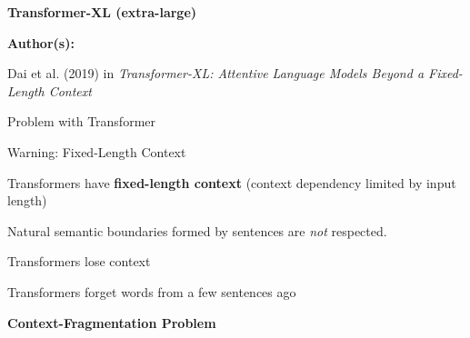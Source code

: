 
\begin{frame}{}
    \begin{center}
        \large \textbf{Transformer-XL (extra-large)}
    \end{center}
    \vspace{20pt}
    
    \textbf{Author(s):}
    \begin{itemizeSpaced}{5pt}
    {\color{DimGrey} 
    
        \item Dai et al. (2019) in \emph{Transformer-XL: Attentive Language Models Beyond a Fixed-Length Context}
        
    }
    \end{itemizeSpaced}
\end{frame}




\begin{frame}{Problem with Transformer}
    
    \begin{alertBlock}{Warning: Fixed-Length Context}
        \footnotesize 
        
        Transformers have \textbf{\alert{fixed-length context}} (context dependency limited by input length) \newline 
        
        Natural semantic boundaries formed by sentences are \textit{not} respected.\newline  
        
        \begin{addmargin}{3em}{}
        \begin{itemizeSpaced}{2pt}
            \footnotesize 
            
            \arrowitem Transformers lose context
            
            \arrowitem Transformers forget words from a few sentences ago 
            
            \arrowitem \textbf{Context-Fragmentation Problem}
        \end{itemizeSpaced}
        \end{addmargin} 
        
    \end{alertBlock}
    

\end{frame}
    
